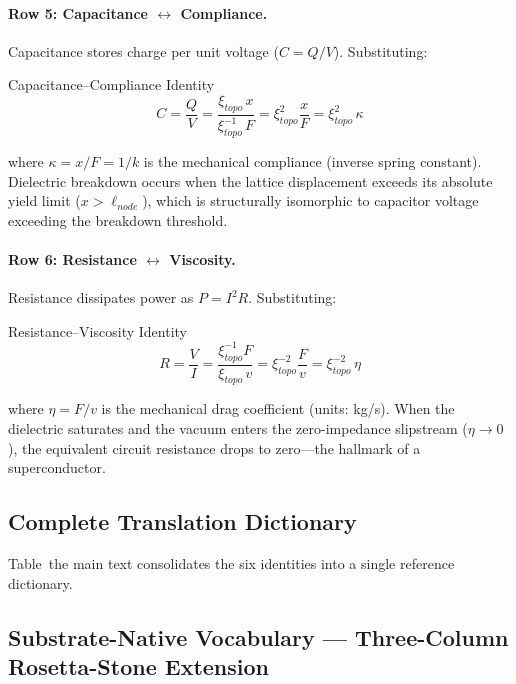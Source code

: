 \paragraph{Row 5: Capacitance $\leftrightarrow$ Compliance.}
Capacitance stores charge per unit voltage ($C = Q/V$). Substituting:
\begin{resultbox}{Capacitance--Compliance Identity}
\begin{equation}
    C = \frac{Q}{V} = \frac{\xi_{topo}\, x}{\xi_{topo}^{-1}\, F} = \xi_{topo}^{2} \frac{x}{F} = \xi_{topo}^{2}\, \kappa
    \label{eq:capacitance_compliance}
\end{equation}
\end{resultbox}
\noindent where $\kappa = x/F = 1/k$ is the mechanical compliance (inverse spring constant). Dielectric breakdown occurs when the lattice displacement exceeds its absolute yield limit ($x > \ell_{node}$), which is structurally isomorphic to capacitor voltage exceeding the breakdown threshold.

\paragraph{Row 6: Resistance $\leftrightarrow$ Viscosity.}
Resistance dissipates power as $P = I^2 R$. Substituting:
\begin{resultbox}{Resistance--Viscosity Identity}
\begin{equation}
    R = \frac{V}{I} = \frac{\xi_{topo}^{-1} F}{\xi_{topo}\, v} = \xi_{topo}^{-2} \frac{F}{v} = \xi_{topo}^{-2}\, \eta
    \label{eq:resistance_viscosity}
\end{equation}
\end{resultbox}
\noindent where $\eta = F/v$ is the mechanical drag coefficient (units: kg/s). When the dielectric saturates and the vacuum enters the zero-impedance slipstream ($\eta \to 0$), the equivalent circuit resistance drops to zero---the hallmark of a superconductor.

\subsection{Complete Translation Dictionary}

Table~the main text consolidates the six identities into a single reference dictionary.



\subsection{Substrate-Native Vocabulary --- Three-Column Rosetta-Stone Extension}
\label{sec:rosetta_stone_3col}

